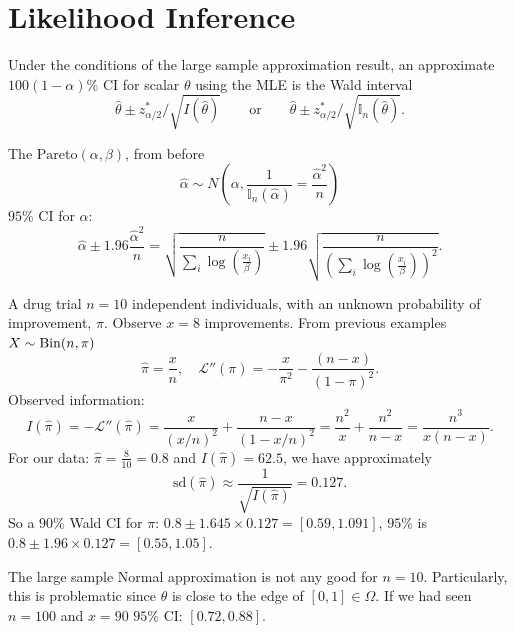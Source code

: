 \documentclass[10pt, a4paper]{article}
\begin{document}
\newpage

\section{Likelihood Inference}

\begin{proposition}
    Under the conditions of the large sample approximation result,
    an approximate $100(1 - \alpha)\%$ CI for scalar $\theta$ using the MLE is the Wald interval
    \[
    \hat{\theta} \pm z_{\alpha / 2}^{*} / \sqrt{I(\hat{\theta})}\qquad\text{or}\qquad \hat{\theta} \pm z_{\alpha / 2}^{*} / \sqrt{\mathbb{I}_n(\hat{\theta})}.
    \]
\end{proposition}

\begin{example}
    The $\mathrm{Pareto}(\alpha, \beta)$,
    from before
    \[
    \hat{\alpha} \sim N\left(\alpha, \frac{1}{\mathbb{I}_n(\hat{\alpha})} = \frac{\hat{\alpha} ^ 2}{n}\right)
    \]
    $95\%$ CI for $\alpha$:
    \[
    \hat{\alpha} \pm 1.96\frac{\hat{\alpha} ^ 2}{n} = \sqrt{\frac{n}{\sum_{i}\log\left(\frac{x_i}{\beta}\right)} }\pm 1.96\sqrt{\frac{n}{\left(\sum_{i}\log\left(\frac{x_i}{\beta}\right)\right) ^ 2}}.
    \]
\end{example}

\begin{example}
    A drug trial $n = 10$ independent individuals,
    with an unknown probability of improvement,
    $\pi$.
    Observe $x = 8$ improvements.
    From previous examples $X \sim \operatorname{Bin}(n, \pi)$
    \[
    \hat{\pi} = \frac{x}{n},\quad \mathcal{L}''(\pi) = -\frac{x}{\pi ^ 2} - \frac{(n - x)}{(1 - \pi) ^ 2}.
    \]
    Observed information:
    \[
    I(\hat{\pi}) = -\mathcal{L}''(\hat{\pi}) = \frac{x}{(x / n) ^ 2} + \frac{n - x}{(1 - x / n) ^ 2} = \frac{n ^ 2}{x} + \frac{n ^ 2}{n - x} = \frac{n ^ 3}{x(n - x)}.
    \]
    For our data:
    $\hat{\pi} = \frac{8}{10} = 0.8$ and $I(\hat{\pi}) = 62.5$,
    we have approximately
    \[
    \mathrm{sd}(\hat{\pi}) \approx \frac{1}{\sqrt{I(\hat{\pi})}} = 0.127.
    \]
    So a $90\%$ Wald CI  for $\pi$:
    $0.8 \pm 1.645 \times 0.127 = [0.59, 1.091]$,
    $95\%$ is $0.8 \pm 1.96 \times 0.127 = [0.55, 1.05]$.

    The large sample Normal approximation is not any good for $n = 10$.
    Particularly,
    this is problematic since $\theta$ is close to the edge of $[0, 1] \in \Omega$.
    If we had seen $n = 100$ and $x = 90$ $95\%$ CI:
    $[0.72, 0.88]$.
\end{example}
\end{document}
